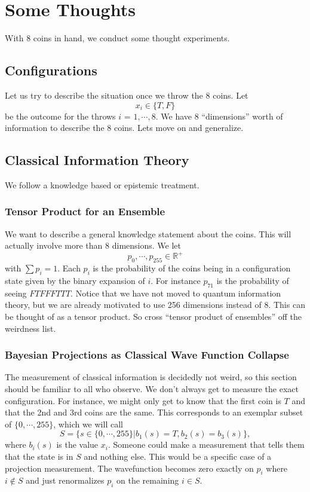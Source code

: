 \documentclass[12pt,a4paper]{article}
\begin{document}
\section{Some Thoughts}
With 8 coins in hand, we conduct some thought experiments.
\subsection{Configurations}
Let us try to describe the situation once we throw the 8 coins.  Let
\[
x_i \in \{T,F\}
\]
be the outcome for the throws $i$ = $1,\cdots,8$.  We have 8 ``dimensions'' worth of information to describe the 8 coins.  Lets move on and generalize.
  
\subsection{Classical Information Theory}
We follow a knowledge based or epistemic treatment.
\subsubsection{Tensor Product for an Ensemble}
We want to describe a general knowledge statement about the coins.  This will actually involve more than 8 dimensions.  We let
\[
   p_0,\cdots,p_{255} \in \mathbb{R}^+
\]
with $\sum p_i = 1$.  Each $p_i$ is the probability of the coins being in a configuration state given by the binary expansion of $i$.  For instance $p_{71}$ is the probability of seeing $FTFFFTTT$. Notice that we have not moved to quantum information theory, but we are already motivated to use 256 dimensions instead of 8.  This can be thought of as a tensor product.  So cross ``tensor product of ensembles'' off the weirdness list.

\subsubsection{Bayesian Projections as Classical Wave Function Collapse}
\label{proj}
The measurement of classical information is decidedly not weird, so this section should be familiar to all who observe.  We don't always get to measure the exact configuration.  For instance, we might only get to know that the first coin is $T$ and that the 2nd and 3rd coins are the same.  This corresponds to an exemplar subset of $\{0,\cdots,255\}$, which we will call
\[
   S = \{s \in \{0,\cdots,255\} | b_1(s) = T, b_2(s) = b_3(s) \},
\]
where $b_i(s)$ is the value $x_i$.  Someone could make a measurement that tells them that the state is in $S$ and nothing else.  This would be a specific case of a projection measurement.  The wavefunction becomes zero exactly on $p_i$ where $i \not \in S$ and just renormalizes $p_i$ on the remaining $i \in S$.
\end{document}
